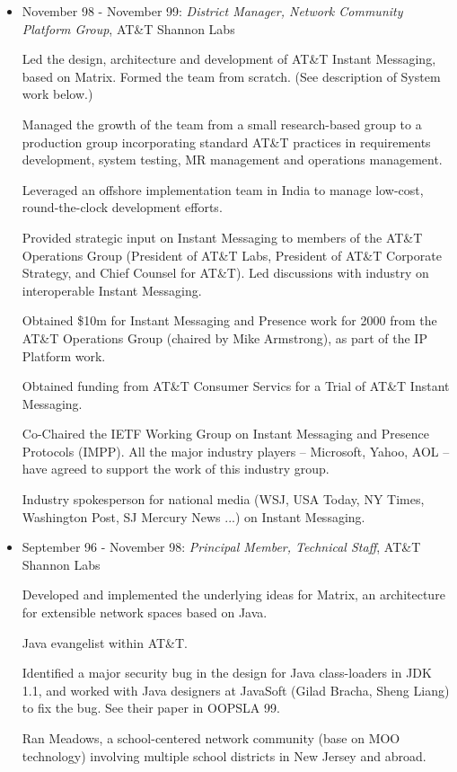 \documentclass{article}
\begin{document}
\begin{itemize}
\item November 98 - November 99: 
  \textit{District Manager, Network Community Platform Group}, AT\&T
  Shannon Labs

  Led the design, architecture and development of AT\&T Instant
  Messaging, based on Matrix. Formed the team from scratch. (See
  description of System work below.)

  Managed the growth of the team from a small research-based group to
  a production group incorporating standard AT\&T practices in
  requirements development, system testing, MR management and
  operations management.

  Leveraged an offshore implementation team in India to manage
  low-cost, round-the-clock development efforts.

  Provided strategic input on Instant Messaging to members of the
  AT\&T Operations Group (President of AT\&T Labs, President of
  AT\&T Corporate Strategy, and Chief Counsel for AT\&T). Led
  discussions with industry on interoperable Instant Messaging.

  Obtained \$10m for Instant Messaging and Presence work for 2000
  from the AT\&T Operations Group (chaired by Mike Armstrong), as
  part of the IP Platform work.
  
  Obtained funding from AT\&T Consumer Servics for a Trial of AT\&T
  Instant Messaging.

  Co-Chaired the IETF Working Group on Instant Messaging and Presence
  Protocols (IMPP). All the major industry players -- Microsoft,
  Yahoo, AOL -- have agreed to support the work of this industry
  group.
   
  Industry spokesperson for national media (WSJ, USA Today, NY Times,
  Washington Post, SJ Mercury News ...) on Instant Messaging.

\item September 96 - November 98: 
  \textit{Principal Member, Technical Staff}, AT\&T Shannon Labs
 
  Developed and implemented the underlying ideas for Matrix, an
  architecture for extensible network spaces based on Java. 

  Java evangelist within AT\&T. 

  Identified a major security bug in the design for Java class-loaders
  in JDK 1.1, and worked with Java designers at JavaSoft (Gilad
  Bracha, Sheng Liang) to fix the bug. See their paper in OOPSLA 99.

  Ran Meadows, a school-centered network community (base on MOO
  technology) involving multiple school districts in New Jersey
  and abroad.


\end{itemize}
\end{document}

